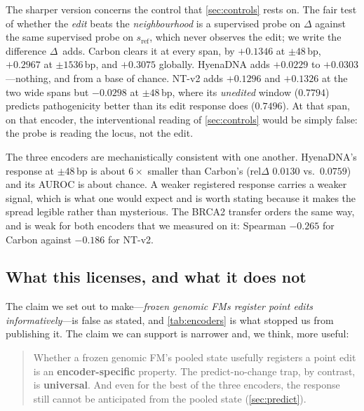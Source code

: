 \documentclass{article}
\newcommand{\sref}{s_{\mathrm{ref}}}
\newcommand{\D}{\Delta}
\begin{document}
The sharper version concerns the control that \cref{sec:controls} rests on. The fair test of whether
the \emph{edit} beats the \emph{neighbourhood} is a supervised probe on $\D$ against the same
supervised probe on $\sref$, which never observes the edit; we write the difference $\D$~adds.
Carbon clears it at every span, by $+0.1346$ at $\pm48$\,bp, $+0.2967$ at $\pm1536$\,bp, and
$+0.3075$ globally. HyenaDNA adds $+0.0229$ to $+0.0303$---nothing, and from a base of chance.
NT-v2 adds $+0.1296$ and $+0.1326$ at the two wide spans but $\mathbf{-0.0298}$ at $\pm48$\,bp,
where its \emph{unedited} window ($0.7794$) predicts pathogenicity better than its edit response
does ($0.7496$). At that span, on that encoder, the interventional reading of \cref{sec:controls}
would be simply false: the probe is reading the locus, not the edit.

The three encoders are mechanistically consistent with one another. HyenaDNA's response at
$\pm48$\,bp is about $6\times$ smaller than Carbon's ($\mathrm{rel}\D$ $0.0130$ vs.\ $0.0759$) and
its AUROC is about chance. A weaker registered response carries a weaker signal, which is what one
would expect and is worth stating because it makes the spread legible rather than mysterious. The
BRCA2 transfer orders the same way, and is weak for both encoders that we measured on it: Spearman
$-0.265$ for Carbon against $-0.186$ for NT-v2.

\figEncoders
\tabEncoders

\subsection{What this licenses, and what it does not}

The claim we set out to make---\emph{frozen genomic FMs register point edits informatively}---is
false as stated, and \cref{tab:encoders} is what stopped us from publishing it. The claim we can
support is narrower and, we think, more useful:

\begin{quote}
Whether a frozen genomic FM's pooled state usefully registers a point edit is an
\textbf{encoder-specific} property. The predict-no-change trap, by contrast, is \textbf{universal}.
And even for the best of the three encoders, the response still cannot be anticipated from the
pooled state (\cref{sec:predict}).
\end{quote}
\end{document}
